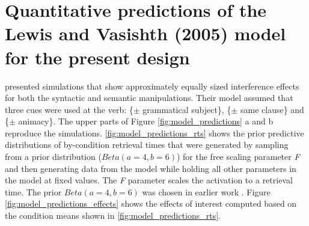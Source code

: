 \documentclass[a4paper, man, floatsintext]{apa7}
\begin{document}
\section{Quantitative predictions of the Lewis and Vasishth (2005) model for the present design}

\textcite{mertzen} presented simulations that show approximately equally sized interference effects 
for both the syntactic and semantic manipulations. Their model assumed that three cues were used at the verb: \{$\pm$ grammatical subject\}, \{$\pm$ same clause\} and \{$\pm$ animacy\}. The upper parts of Figure \ref{fig:model_predictions} a and b reproduce the \textcite{mertzen} simulations. \ref{fig:model_predictions_rts} shows the prior predictive distributions of by-condition retrieval times that were generated by sampling from a prior distribution ($Beta(a=4,b=6)$) for the free scaling parameter \textit{F} and then generating data from the model while holding all other parameters in the model at fixed values. The \textit{F} parameter scales the activation to a retrieval time. The prior $Beta(a=4,b=6)$ was chosen in earlier work \parencite{jaeger_etal_2020,vasishth2020_abc}. Figure \ref{fig:model_predictions_effects} shows the effects of interest computed based on the condition means shown in \ref{fig:model_predictions_rts}.
\end{document}
